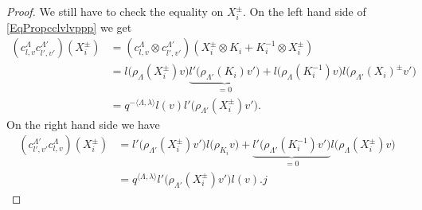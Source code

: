 \begin{proof}
	We still have to check the equality on \( X_i^{\pm}\). On the left hand side of \eqref{EqPropcclvlvppp} we get
	\begin{subequations}
		\begin{align}
			(c_{l,v}^{\Lambda}c^{\Lambda'}_{l',v'})(X_i^{\pm}) & =(c_{l,v}^{\Lambda}\otimes c^{\Lambda'}_{l',v'})(X_i^{\pm}\otimes K_i+K_i^{-1}\otimes X_i^{\pm})                                                                               \\
			                                                   & =l\big( \rho_{\Lambda}(X_i^{\pm})v \big)\underbrace{l'\big( \rho_{\Lambda'}(K_i)v' \big)}_{=0}+l\big( \rho_{\Lambda}(K_i^{-1})v \big)l\big( \rho_{\Lambda'}(X_i)^{\pm}v' \big) \\
			                                                   & =q^{-\langle \Lambda, \lambda\rangle }l(v)l'\big( \rho_{\Lambda'}(X_i^{\pm})v' \big).
		\end{align}
	\end{subequations}
	On the right hand side we have
	\begin{subequations}
		\begin{align}
			(c_{l',v'}^{\Lambda'}c_{l,v}^{\Lambda})(X_i^{\pm}) & =l'\big( \rho_{\Lambda'}(X_i^{\pm})v' \big)l\big( \rho_{K_i}v \big)+
			\underbrace{l'\big( \rho_{\Lambda'}(K_i^{-1})v' \big)}_{=0} l\big( \rho_{\Lambda}(X_i^{\pm})v \big)                                        \\
			                                                   & =q^{\langle \Lambda, \lambda\rangle }l'\big( \rho_{\Lambda'}(X_i^{\pm})v' \big)l(v).j
		\end{align}
	\end{subequations}
\end{proof}
